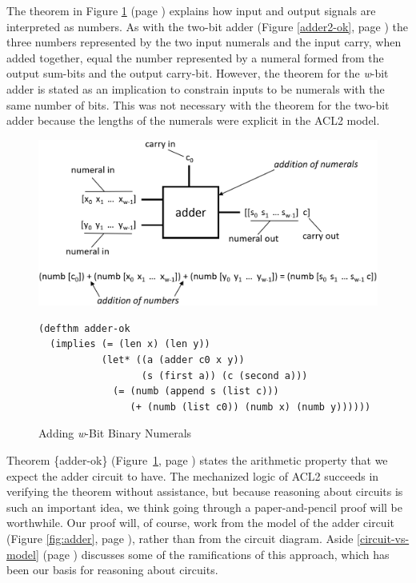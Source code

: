 The theorem in Figure \ref{fig:adder-thm} (page \pageref{fig:adder-thm})
explains how input and output signals are interpreted as numbers.
As with the two-bit adder (Figure \ref{adder2-ok}, page \pageref{adder2-ok})
the three numbers represented by the two input
numerals and the input carry, when added together,
equal the number represented
by a numeral formed from the output sum-bits and
the output carry-bit.
However, the theorem for the \emph{w}-bit adder
is stated as an implication to constrain
inputs to be numerals with the same number of bits.
This was not necessary with the theorem for the two-bit adder
because the lengths of the numerals were explicit in the ACL2 model.

\begin{figure}
\begin{center}
\includegraphics[scale=0.3]{Images/adder-thm.png}
\begin{Verbatim}
(defthm adder-ok
  (implies (= (len x) (len y))
           (let* ((a (adder c0 x y))
                  (s (first a)) (c (second a)))
             (= (numb (append s (list c)))
                (+ (numb (list c0)) (numb x) (numb y))))))
\end{Verbatim}
\end{center}
\caption{Adding \emph{w}-Bit Binary Numerals}
\label{fig:adder-thm}
\end{figure}

Theorem \{adder-ok\} (Figure~\ref{fig:adder-thm}, page \pageref{fig:adder-thm})
states the arithmetic property that we expect the adder circuit to have.
The mechanized logic of ACL2 succeeds in verifying
the theorem without assistance,
but because reasoning about circuits is such an important idea,
we think going through
a paper-and-pencil proof will be worthwhile.
Our proof will, of course, work from
the model of the adder circuit
(Figure \ref{fig:adder}, page \pageref{fig:adder}),
rather than from the circuit diagram.
Aside \ref{circuit-vs-model} (page \pageref{circuit-vs-model})
discusses some of the ramifications of this approach,
which has been our basis for reasoning about circuits.

